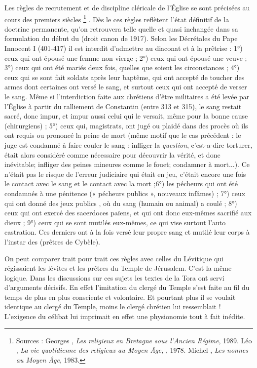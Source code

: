  Les règles de recrutement et de discipline cléricale de l'Église se sont précisées au cours des premiers siècles%
\footnote{Sources : Georges , \emph{Les religieux en Bretagne sous l'Ancien Régime}, 1989. Léo , \emph{La vie quotidienne des religieux au Moyen Âge, }, 1978. Michel , \emph{Les nonnes au Moyen Âge}, 1983.}%
. Dès le  ces règles reflètent l'état définitif de la doctrine permanente, qu'on retrouvera telle quelle et quasi inchangée dans sa formulation du début du  (droit canon de 1917). Selon les Décrétales du Pape Innocent I (401-417) il est interdit d'admettre au diaconat et à la prêtrise : 1°) ceux qui ont épousé une femme non vierge ; 2°) ceux qui ont épousé une veuve ; 3°) ceux qui ont été mariés deux fois, quelles que soient les circonstances ; 4°) ceux qui se sont fait soldats après leur baptême, qui ont accepté de toucher des armes dont certaines ont versé le sang, et surtout ceux qui ont accepté de verser le sang. Même si l'interdiction faite aux chrétiens d'être militaires a été levée par l'Église à partir du ralliement de Constantin (entre 313 et 315), le sang restait sacré, donc impur, et impur aussi celui qui le versait, même pour la bonne cause (chirurgiens) ; 5°) ceux qui, magistrats, ont jugé ou plaidé dans des procès où ils ont requis ou prononcé la peine de mort (même motif que le cas précédent : le juge est condamné à faire couler le sang : infliger la \emph{question}, c'est-a-dire torturer, était alors considéré comme nécessaire pour découvrir la vérité, et donc inévitable; infliger des peines mineures comme le fouet; condamner à mort...). Ce n'était pas le risque de l'erreur judiciaire qui était en jeu, c'était encore une fois le contact avec le sang et le contact avec la mort ;6°) les pécheurs qui ont été condamnés à une pénitence (« pécheurs publics », nouveaux infâmes) ; 7°) ceux qui ont donné des jeux publics , où du sang (humain ou animal) a coulé ; 8°) ceux qui ont exercé des sacerdoces païens, et qui ont donc eux-mêmes sacrifié aux dieux ; 9°) ceux qui se sont mutilés eux-mêmes, ce qui vise surtout l'auto castration. Ces derniers ont à la fois versé leur propre sang et mutilé leur corps à l'instar des  (prêtres de Cybèle).

 On peut comparer trait pour trait ces règles avec celles du Lévitique qui régissaient les lévites et les prêtres du Temple de Jérusalem. C'est la même logique. Dans les discussions sur ces sujets les textes de la Tora ont servi d'arguments décisifs. En effet l'imitation du clergé du Temple s'est faite au fil du temps de plus en plus consciente et volontaire. Et pourtant plus il se voulait identique au clergé du Temple, moins le clergé chrétien lui ressemblait ! L'exigence du célibat lui imprimait en effet une physionomie tout à fait inédite. 


